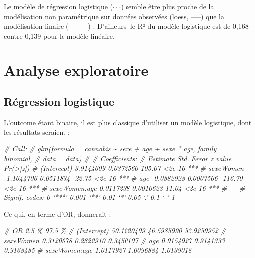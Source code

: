 \documentclass[
]{book}
\newenvironment{Shaded}{\begin{snugshade}}{\end{snugshade}}
\newcommand{\CommentTok}[1]{\textcolor[rgb]{0.56,0.35,0.01}{\textit{#1}}}
\begin{document}
Le modèle de régression logistique (\(\cdot\cdot\cdot\)) semble être plus proche de la modélisation non paramétrique sur données observées (loess, -----) que la modélisation linaire (\(---\)) . D'ailleurs, le R² du modèle logistique est de 0,168 contre 0,139 pour le modèle linéaire.

\hypertarget{analyse-exploratoire-1}{%
\section{Analyse exploratoire}\label{analyse-exploratoire-1}}

\hypertarget{ruxe9gression-logistique-1}{%
\subsection{Régression logistique}\label{ruxe9gression-logistique-1}}

L'outcome étant binaire, il est plus classique d'utiliser un modèle logistique, dont les résultats seraient :

\begin{Shaded}
\begin{Highlighting}[]
\CommentTok{\# Call:}
\CommentTok{\# glm(formula = cannabis \textasciitilde{} sexe + age + sexe * age, family = binomial, }
\CommentTok{\#     data = data)}
\CommentTok{\# }
\CommentTok{\# Coefficients:}
\CommentTok{\#                 Estimate Std. Error z value Pr(\textgreater{}|z|)    }
\CommentTok{\# (Intercept)    3.9144609  0.0372560  105.07   \textless{}2e{-}16 ***}
\CommentTok{\# sexeWomen     {-}1.1644706  0.0511834  {-}22.75   \textless{}2e{-}16 ***}
\CommentTok{\# age           {-}0.0882928  0.0007566 {-}116.70   \textless{}2e{-}16 ***}
\CommentTok{\# sexeWomen:age  0.0117238  0.0010623   11.04   \textless{}2e{-}16 ***}
\CommentTok{\# {-}{-}{-}}
\CommentTok{\# Signif. codes:  0 ‘***’ 0.001 ‘**’ 0.01 ‘*’ 0.05 ‘.’ 0.1 ‘ ’ 1}
\end{Highlighting}
\end{Shaded}

Ce qui, en terme d'OR, donnerait :

\begin{Shaded}
\begin{Highlighting}[]
\CommentTok{\#                       OR      2.5 \%     97.5 \%}
\CommentTok{\# (Intercept)   50.1220409 46.5985990 53.9259952}
\CommentTok{\# sexeWomen      0.3120878  0.2822910  0.3450107}
\CommentTok{\# age            0.9154927  0.9141333  0.9168485}
\CommentTok{\# sexeWomen:age  1.0117927  1.0096884  1.0139018}
\end{Highlighting}
\end{Shaded}
\end{document}
